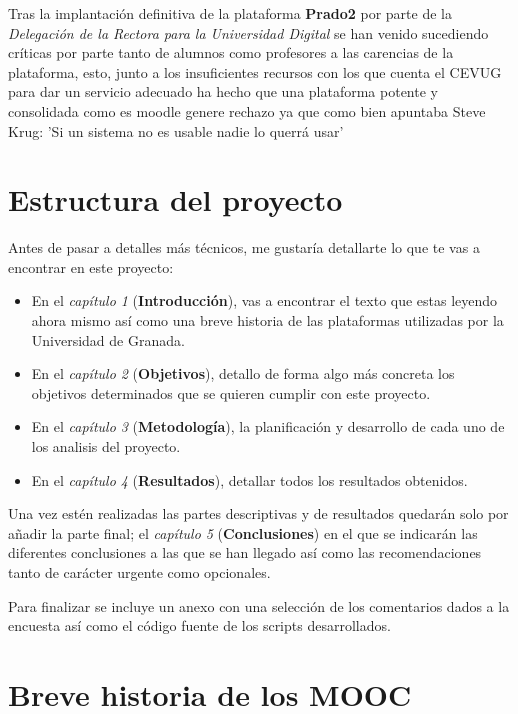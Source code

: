 \bigskip
Tras la implantación definitiva de la plataforma \textbf{Prado2} por parte de la \textit{Delegación de la Rectora para la Universidad Digital} se han venido sucediendo críticas por parte tanto de alumnos como profesores a las carencias de la plataforma, esto, junto a los insuficientes recursos con los que cuenta el CEVUG para dar un servicio adecuado ha hecho que una plataforma potente y consolidada como es moodle genere rechazo ya que como bien apuntaba Steve Krug: 'Si un sistema no es usable nadie lo querrá usar' \cite{stevekrug}


\section{Estructura del proyecto}


\bigskip
Antes de pasar a detalles más técnicos, me gustaría detallarte lo que te vas a encontrar en este proyecto:

\begin{itemize}
  \item En el \textit{capítulo 1} (\textbf{Introducción}), vas a encontrar el texto que estas leyendo ahora mismo así como una breve historia de las plataformas utilizadas por la Universidad de Granada.
  \item En el \textit{capítulo 2} (\textbf{Objetivos}), detallo de forma algo más concreta los objetivos determinados que se quieren cumplir con este proyecto.
  \item En el \textit{capítulo 3} (\textbf{Metodología}), la planificación y desarrollo de cada uno de los analisis del proyecto.
  \item En el \textit{capítulo 4} (\textbf{Resultados}), detallar todos los resultados obtenidos.
\end{itemize}

\bigskip
Una vez estén realizadas las partes descriptivas y de resultados quedarán solo por añadir la parte final; el \textit{capítulo 5} (\textbf{Conclusiones}) en el que se indicarán las diferentes conclusiones a las que se han llegado así como las recomendaciones tanto de carácter urgente como opcionales.

\bigskip
Para finalizar se incluye un anexo con una selección de los comentarios dados a la encuesta así como el código fuente de los scripts desarrollados.

\section{Breve historia de los MOOC}


